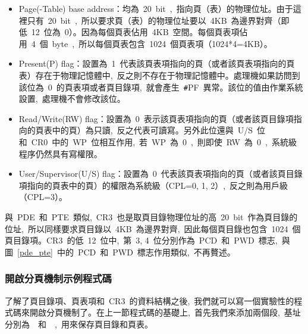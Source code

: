 
\begin{itemize}
\item Page(-Table) base address：均為~20~bit~,~指向頁（表）的物理位址。由于這裡只有~20~bit~,~所以要求頁（表）的物理位址要以~4KB~為邊界對齊（即低~12~位為~0）。因為每個頁表佔用~4KB~空間。每個頁表項佔用~4~個~byte~,~所以每個頁表包含~1024~個頁表項（1024*4=4KB）。
\item Present(P) flag：設置為~1~代表該頁表項指向的頁（或者該頁表項指向的頁表）存在于物理記憶體中,~反之則不存在于物理記憶體中。處理機如果訪問到該位為~0~的頁表項或者頁目錄項,~就會產生~\texttt{\#}PF~異常。該位的值由作業系統設置,~處理機不會修改該位。
\item Read/Write(RW) flag：設置為~0~表示該頁表項指向的頁（或者該頁目錄項指向的頁表中的頁）為只讀,~反之代表可讀寫。另外此位還與~U/S~位和~CR0~中的~WP~位相互作用,~若~WP~為~0~,~則即使~RW~為~0~,~系統級程序仍然具有寫權限。
\item User/Supervisor(U/S) flag：設置為~0~代表該頁表項指向的頁（或者該頁目錄項指向的頁表中的頁）的權限為系統級（CPL=0, 1, 2）,~反之則為用戶級（CPL=3）。
\end{itemize}

與~PDE~和~PTE~類似,~CR3~也是取頁目錄物理位址的高~20~bit~作為頁目錄的位址,~所以同樣要求頁目錄以~4KB~為邊界對齊,~因此每個頁目錄也包含~1024~個頁目錄項。CR3~的低~12~位中,~第~3, 4~位分別作為~PCD~和~PWD~標志,~與圖~\ref{pde_pte}~中的~PCD~和~PWD~標志作用類似,~不再贅述。

\subsubsection{開啟分頁機制示例程式碼}

了解了頁目錄項、頁表項和~CR3~的資料結構之後,~我們就可以寫一個實驗性的程式碼來開啟分頁機制了。在上一節程式碼的基礎上,~首先我們來添加兩個段,~基址分別為~~和~~,~用來保存頁目錄和頁表。



